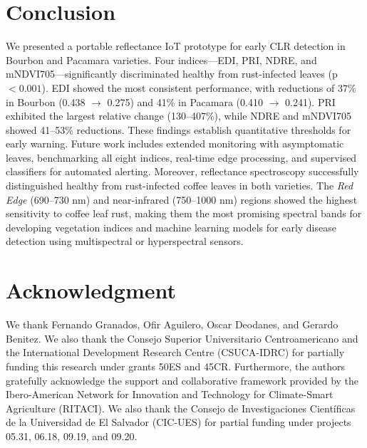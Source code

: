 \documentclass[conference]{IEEEtran}
\begin{document}
\section{Conclusion}
We presented a portable reflectance IoT prototype for early CLR detection in Bourbon and Pacamara varieties. Four indices—EDI, PRI, NDRE, and mNDVI705—significantly discriminated healthy from rust-infected leaves (p $< 0.001$). EDI showed the most consistent performance, with reductions of 37\% in Bourbon (0.438 $\rightarrow$ 0.275) and 41\% in Pacamara (0.410 $\rightarrow$ 0.241). PRI exhibited the largest relative change (130--407\%), while NDRE and mNDVI705 showed 41--53\% reductions. These findings establish quantitative thresholds for early warning. Future work includes extended monitoring with asymptomatic leaves, benchmarking all eight indices, real-time edge processing, and supervised classifiers for automated alerting. Moreover, reflectance spectroscopy successfully distinguished healthy from rust-infected coffee leaves in both varieties. The \textit{Red Edge} (690--730 nm) and near-infrared (750--1000 nm) regions showed the highest sensitivity to coffee leaf rust, making them the most promising spectral bands for developing vegetation indices and machine learning models for early disease detection using multispectral or hyperspectral sensors.

\section*{Acknowledgment}
We thank Fernando Granados, Ofir Aguilero, Oscar Deodanes, and Gerardo Benitez. We also thank the Consejo Superior Universitario Centroamericano and the International Development Research Centre (CSUCA-IDRC) for partially funding this research under grants 50ES and 45CR. Furthermore, the authors gratefully acknowledge the support and collaborative framework provided by the Ibero-American Network for Innovation and Technology for Climate-Smart Agriculture (RITACI). We also thank the Consejo de Investigaciones Científicas de la Universidad de El Salvador (CIC-UES) for partial funding under projects 05.31, 06.18, 09.19, and 09.20.



\end{document}
